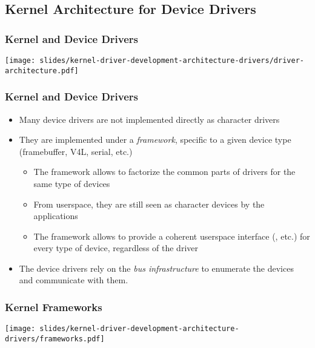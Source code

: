 \subsection{Kernel Architecture for Device Drivers}

\begin{frame}
  \frametitle{Kernel and Device Drivers}
  \begin{center}
    \texttt{[image: slides/kernel-driver-development-architecture-drivers/driver-architecture.pdf]}
  \end{center}
\end{frame}

\begin{frame}
  \frametitle{Kernel and Device Drivers}
  \begin{itemize}
  \item Many device drivers are not implemented directly as character
    drivers
  \item They are implemented under a \emph{framework}, specific to a
    given device type (framebuffer, V4L, serial, etc.)
    \begin{itemize}
    \item The framework allows to factorize the common parts of
      drivers for the same type of devices
    \item From userspace, they are still seen as character devices by
      the applications
    \item The framework allows to provide a coherent userspace
      interface (, etc.) for every type of device,
      regardless of the driver
    \end{itemize}
  \item The device drivers rely on the \emph{bus infrastructure} to
    enumerate the devices and communicate with them.
  \end{itemize}
\end{frame}

\begin{frame}
  \frametitle{Kernel Frameworks}
  \begin{center}
    \texttt{[image: slides/kernel-driver-development-architecture-drivers/frameworks.pdf]}
  \end{center}
\end{frame}

